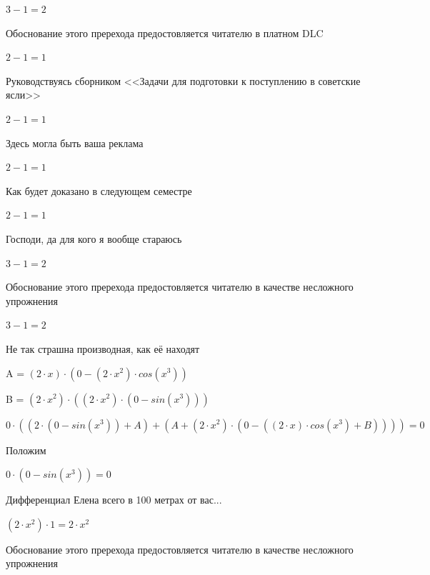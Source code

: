 \documentclass[12pt,a4paper,fleqn]{article}
\begin{document}
\begin{center}$3-1 = 2$\end{center}
Обоснование этого пререхода предостовляется читателю в платном DLC

\begin{center}$2-1 = 1$\end{center}
Руководствуясь сборником <<Задачи для подготовки к поступлению в советские ясли>>\cite{link1}

\begin{center}$2-1 = 1$\end{center}
Здесь могла быть ваша реклама

\begin{center}$2-1 = 1$\end{center}
Как будет доказано в следующем семестре

\begin{center}$2-1 = 1$\end{center}
Господи, да для кого я вообще стараюсь

\begin{center}$3-1 = 2$\end{center}
Обоснование этого пререхода предостовляется читателю в качестве несложного упрожнения

\begin{center}$3-1 = 2$\end{center}
Не так страшна производная, как её находят\cite{link2}

\begin{center}
A = $(2 \cdot x) \cdot (0-(2 \cdot x^{2}) \cdot cos(x^{3}))$\end{center}
\begin{center}
B = $(2 \cdot x^{2}) \cdot ((2 \cdot x^{2}) \cdot (0-sin(x^{3})))$\end{center}
\begin{center}
$0 \cdot ((2 \cdot (0-sin(x^{3}))+A)+(A+(2 \cdot x^{2}) \cdot (0-((2 \cdot x) \cdot cos(x^{3})+B)))) = 0$\end{center}
Положим

\begin{center}
$0 \cdot (0-sin(x^{3})) = 0$\end{center}
Дифференциал Елена всего в 100 метрах от вас...

\begin{center}
$(2 \cdot x^{2}) \cdot 1 = 2 \cdot x^{2}$\end{center}
Обоснование этого пререхода предостовляется читателю в качестве несложного упрожнения
\end{document}
